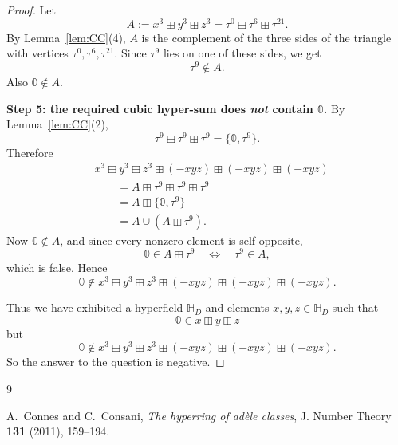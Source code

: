 \documentclass[11pt]{article}
\newcommand{\hz}{\mathbb{0}}
\begin{document}
\begin{proof}
Let
\[
A:=x^3\boxplus y^3\boxplus z^3
=\tau^0\boxplus \tau^6\boxplus \tau^{21}.
\]
By Lemma~\ref{lem:CC}(4), $A$ is the complement of the three sides of the triangle with vertices $\tau^0,\tau^6,\tau^{21}$. Since $\tau^9$ lies on one of these sides, we get
\[
\tau^9\notin A.
\]
Also $\hz\notin A$.

\medskip

\noindent\textbf{Step 5: the required cubic hyper-sum does \emph{not} contain $\hz$.}
By Lemma~\ref{lem:CC}(2),
\[
\tau^9\boxplus\tau^9\boxplus\tau^9=\{\hz,\tau^9\}.
\]
Therefore
\[
\begin{aligned}
&x^3\boxplus y^3\boxplus z^3\boxplus(-xyz)\boxplus(-xyz)\boxplus(-xyz)\\
&\qquad = A\boxplus \tau^9\boxplus\tau^9\boxplus\tau^9\\
&\qquad = A\boxplus\{\hz,\tau^9\}\\
&\qquad = A\cup (A\boxplus \tau^9).
\end{aligned}
\]
Now $\hz\notin A$, and since every nonzero element is self-opposite,
\[
\hz\in A\boxplus \tau^9
\quad\Longleftrightarrow\quad
\tau^9\in A,
\]
which is false. Hence
\[
\hz\notin x^3\boxplus y^3\boxplus z^3\boxplus(-xyz)\boxplus(-xyz)\boxplus(-xyz).
\]

Thus we have exhibited a hyperfield $\mathbb H_D$ and elements $x,y,z\in \mathbb H_D$ such that
\[
\hz\in x\boxplus y\boxplus z
\]
but
\[
\hz\notin x^3\boxplus y^3\boxplus z^3\boxplus(-xyz)\boxplus(-xyz)\boxplus(-xyz).
\]
So the answer to the question is negative.
\end{proof}

\begin{thebibliography}{9}

A.~Connes and C.~Consani,
\emph{The hyperring of ad\`ele classes},
J. Number Theory \textbf{131} (2011), 159--194.

\end{thebibliography}
\end{document}
